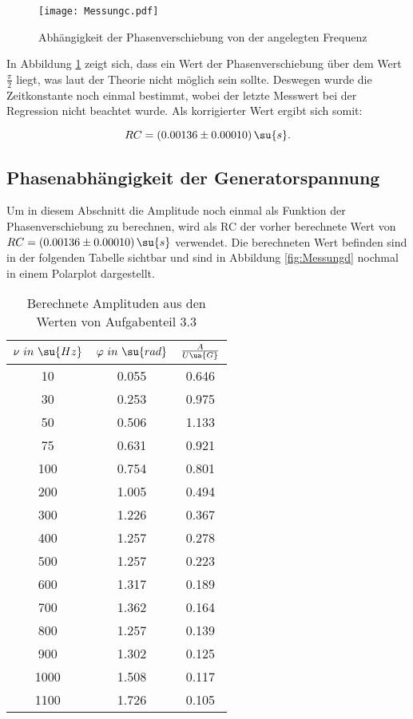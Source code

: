 \begin{figure}
  \centering
  \texttt{[image: Messungc.pdf]}
  \caption{Abhängigkeit der Phasenverschiebung von der angelegten Frequenz}
  \label{fig:Messungc}
\end{figure}

In Abbildung \ref{fig:Messungc} zeigt sich, dass ein Wert der Phasenverschiebung
über dem Wert $\frac{\pi}{2}$ liegt, was laut der Theorie nicht möglich sein sollte.
Deswegen wurde die Zeitkonstante noch einmal bestimmt, wobei der letzte Messwert
bei der Regression nicht beachtet wurde. Als korrigierter Wert ergibt sich somit:

\begin{equation}
  RC = (0.00136 \pm 0.00010) \, \su{s} .
\end{equation}

\subsection{Phasenabhängigkeit der Generatorspannung}

Um in diesem Abschnitt die Amplitude noch einmal als Funktion der Phasenverschiebung
zu berechnen, wird als RC der vorher berechnete Wert von $RC = (0.00136 \pm 0.00010)
\,\su{s}$ verwendet. Die berechneten Wert befinden sind in der folgenden Tabelle
sichtbar und sind in Abbildung \ref{fig:Messungd} nochmal in einem Polarplot dargestellt.

\begin{table}
  \centering
  \caption{Berechnete Amplituden aus den Werten von Aufgabenteil 3.3}
  \label{tab:AmplitudeNeu}
  \begin{tabular}{c c c }
    \toprule $\nu \,\, in  \,\, \su{Hz}$ & $\varphi \,\, in \,\, \su{rad}$
           & $\frac{A}{U\ua{G}}$ \\
    \midrule
     10 & 0.055 & 0.646 \\
     30 & 0.253 & 0.975 \\
     50 & 0.506 & 1.133 \\
     75 & 0.631 & 0.921 \\
    100 & 0.754 & 0.801 \\
    200 & 1.005 & 0.494 \\
    300 & 1.226 & 0.367 \\
    400 & 1.257 & 0.278 \\
    500 & 1.257 & 0.223 \\
    600 & 1.317 & 0.189 \\
    700 & 1.362 & 0.164 \\
    800 & 1.257 & 0.139 \\
    900 & 1.302 & 0.125 \\
    1000 & 1.508 & 0.117 \\
    1100 & 1.726 & 0.105 \\
    \bottomrule
  \end{tabular}
\end{table}

